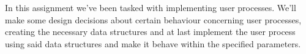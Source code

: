 \noindent In this assignment we've been tasked with implementing user processes. We'll
make some design decisions about certain behaviour concerning user processes, 
creating the necessary data structures and at last implement the user process
using said data structures and make it behave within the specified parameters.

